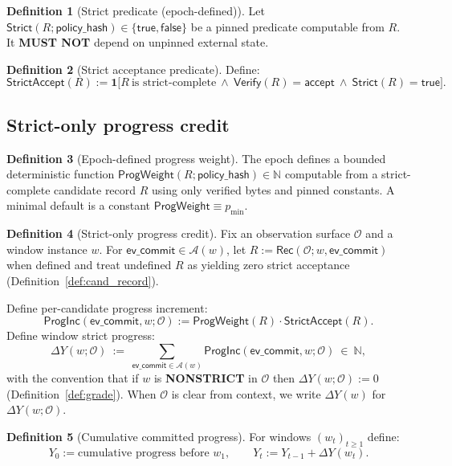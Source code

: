 \documentclass[11pt]{article}
\newcommand{\MUSTNOT}{\textbf{MUST NOT}}
\newcommand{\N}{\mathbb{N}}
\newcommand{\1}{\mathbf{1}}
\theoremstyle{definition}
\newtheorem{definition}{Definition}
\theoremstyle{plain}
\begin{document}
\begin{definition}[Strict predicate (epoch-defined)]
\label{def:strict_pred}
Let $\mathsf{Strict}(R;\textsf{policy\_hash})\in\{\textsf{true},\textsf{false}\}$ be a pinned predicate computable from $R$. It \MUSTNOT{} depend on unpinned external state.
\end{definition}

\begin{definition}[Strict acceptance predicate]
\label{def:strict_accept}
Define:
\[
\mathsf{StrictAccept}(R):=
\1\big[R\ \text{is strict-complete}\ \wedge\ \mathsf{Verify}(R)=\textsf{accept}\ \wedge\ \mathsf{Strict}(R)=\textsf{true}\big].
\]
\end{definition}

\subsection{Strict-only progress credit}

\begin{definition}[Epoch-defined progress weight]
\label{def:prog_weight}
The epoch defines a bounded deterministic function $\mathsf{ProgWeight}(R;\textsf{policy\_hash})\in\N$ computable from a strict-complete candidate record $R$ using only verified bytes and pinned constants. A minimal default is a constant $\mathsf{ProgWeight}\equiv p_{\min}$.
\end{definition}

\begin{definition}[Strict-only progress credit]
\label{def:proginc}
Fix an observation surface $\mathcal{O}$ and a window instance $w$.
For $\textsf{ev\_commit}\in\mathcal{A}(w)$, let $R:=\mathsf{Rec}(\mathcal{O};w,\textsf{ev\_commit})$ when defined and treat undefined $R$ as yielding zero strict acceptance (Definition~\ref{def:cand_record}).

Define per-candidate progress increment:
\[
\mathsf{ProgInc}(\textsf{ev\_commit},w;\mathcal{O}):=
\mathsf{ProgWeight}(R)\cdot \mathsf{StrictAccept}(R).
\]
Define window strict progress:
\[
\Delta Y(w;\mathcal{O}) \ :=\ \sum_{\textsf{ev\_commit}\in \mathcal{A}(w)} \mathsf{ProgInc}(\textsf{ev\_commit},w;\mathcal{O})\ \in\ \N,
\]
with the convention that if $w$ is \textbf{NONSTRICT} in $\mathcal{O}$ then $\Delta Y(w;\mathcal{O}):=0$ (Definition~\ref{def:grade}).
When $\mathcal{O}$ is clear from context, we write $\Delta Y(w)$ for $\Delta Y(w;\mathcal{O})$.
\end{definition}

\begin{definition}[Cumulative committed progress]
For windows $(w_t)_{t\ge 1}$ define:
\[
Y_0 := \text{cumulative progress before } w_1,\qquad
Y_t := Y_{t-1} + \Delta Y(w_t).
\]
\end{definition}
\end{document}
